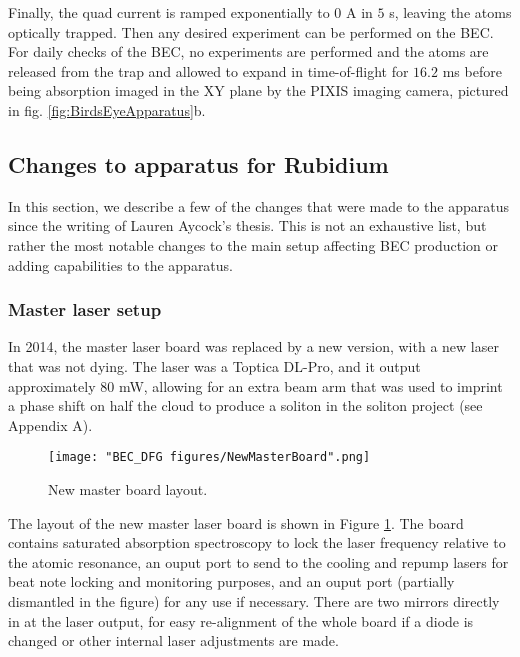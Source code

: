 Finally, the quad current is ramped exponentially to $0$ A in $5$ s, leaving the atoms optically trapped. Then any desired experiment can be performed on the BEC. For daily checks of the BEC, no experiments are performed and the atoms are released from the trap and allowed to expand in time-of-flight for $16.2$ ms before being absorption imaged in the XY plane by the PIXIS imaging camera, pictured in fig. \ref{fig:BirdsEyeApparatus}b.

\subsection{Changes to apparatus for Rubidium}\label{sec:BECchanges}

In this section, we describe a few of the changes that were made to the apparatus since the writing of Lauren Aycock's thesis\cite{AycockThesis}. This is not an exhaustive list, but rather the most notable changes to the main setup affecting BEC production or adding capabilities to the apparatus. 

\subsubsection{Master laser setup}
In 2014, the master laser board was replaced by a new version, with a new laser that was not dying. The laser was a Toptica DL-Pro, and it output approximately $80$ mW, allowing for an extra beam arm that was used to imprint a phase shift on half the cloud to produce a soliton in the soliton project (see Appendix A)\cite{Aycock2017}.
\begin{figure}
	\texttt{[image: "BEC\_DFG figures/NewMasterBoard".png]}
\caption[New master board layout]{New master board layout. }
\label{fig:NewMasterBoard}
\end{figure}

The layout of the new master laser board is shown in Figure \ref{fig:NewMasterBoard}. The board contains saturated absorption spectroscopy to lock the laser frequency relative to the atomic resonance, an ouput port to send to the cooling and repump lasers for beat note locking and monitoring purposes, and an ouput port (partially dismantled in the figure) for any use if necessary. There are two mirrors directly in at the laser output, for easy re-alignment of the whole board if a diode is changed or other internal laser adjustments are made. 

